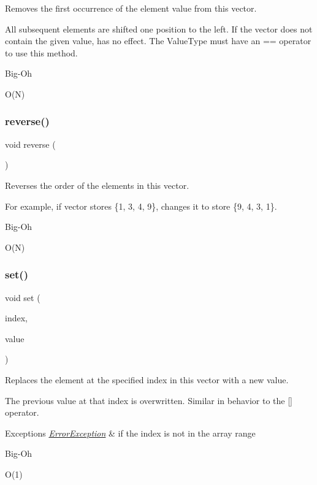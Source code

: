 Removes the first occurrence of the element value from this vector. 

All subsequent elements are shifted one position to the left. If the vector does not contain the given value, has no effect. The Value\+Type must have an == operator to use this method. \begin{DoxyRefDesc}{Big-\/\+Oh}
\item[\mbox{\hyperlink{BigOh__BigOh000130}{Big-\/\+Oh}}]O(\+N) \end{DoxyRefDesc}
\mbox{\label{classVector_a310c0bebc002158f5646a91d60e4dc89}} 
\subsubsection{\texorpdfstring{reverse()}{reverse()}}
{\footnotesize\ttfamily void reverse (\begin{DoxyParamCaption}{ }\end{DoxyParamCaption})}



Reverses the order of the elements in this vector. 

For example, if vector stores \{1, 3, 4, 9\}, changes it to store \{9, 4, 3, 1\}. \begin{DoxyRefDesc}{Big-\/\+Oh}
\item[\mbox{\hyperlink{BigOh__BigOh000131}{Big-\/\+Oh}}]O(\+N) \end{DoxyRefDesc}
\mbox{\label{classVector_a004ea6d6bc4a512ce4d52962727d5db2}} 
\subsubsection{\texorpdfstring{set()}{set()}}
{\footnotesize\ttfamily void set (\begin{DoxyParamCaption}\item[{int}]{index,  }\item[{const Value\+Type \&}]{value }\end{DoxyParamCaption})}



Replaces the element at the specified index in this vector with a new value. 

The previous value at that index is overwritten. Similar in behavior to the \mbox{[}\mbox{]} operator. 
\begin{DoxyExceptions}{Exceptions}
{\em \mbox{\hyperlink{classErrorException}{Error\+Exception}}} & if the index is not in the array range \\
\hline
\end{DoxyExceptions}
\begin{DoxyRefDesc}{Big-\/\+Oh}
\item[\mbox{\hyperlink{BigOh__BigOh000132}{Big-\/\+Oh}}]O(1) \end{DoxyRefDesc}
\mbox{\label{classVector_a1905fe84eb39f020b32c58baf7a76758}} 
